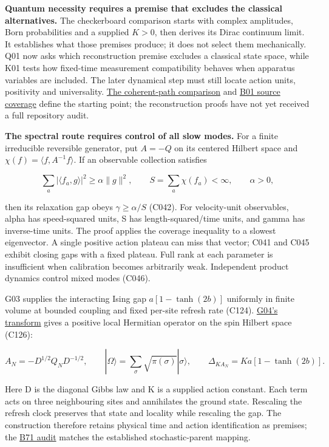 \documentclass[11pt,a4paper]{article}
\begin{document}
\textbf{Quantum necessity requires a premise that excludes the classical
alternatives.} The checkerboard comparison starts with complex
amplitudes, Born probabilities and a supplied \(K>0\), then derives its
Dirac continuum limit. It establishes what those premises produce; it
does not select them mechanically. Q01 now asks which reconstruction
premise excludes a classical state space, while K01 tests how fixed-time
measurement compatibility behaves when apparatus variables are included.
The later dynamical step must still locate action units, positivity and
universality. \href{checkerboard-dynamics.md}{The coherent-path
comparison} and \href{../references/batches/B01.md}{B01 source coverage}
define the starting point; the reconstruction proofs have not yet
received a full repository audit.

\textbf{The spectral route requires control of all slow modes.} For a
finite irreducible reversible generator, put \(A=-Q\) on its centered
Hilbert space and \(\chi(f)=\langle f,A^{-1}f\rangle\). If an observable
collection satisfies

\[\sum_a|\langle f_a,g\rangle|^2\ge\alpha\|g\|^2,\qquad
S=\sum_a\chi(f_a)<\infty,\qquad\alpha>0,\]

then its relaxation gap obeys \(\gamma\ge\alpha/S\) (C042). For
velocity-unit observables, alpha has speed-squared units, S has
length-squared/time units, and gamma has inverse-time units. The proof
applies the coverage inequality to a slowest eigenvector. A single
positive action plateau can miss that vector; C041 and C045 exhibit
closing gaps with a fixed plateau. Full rank at each parameter is
insufficient when calibration becomes arbitrarily weak. Independent
product dynamics control mixed modes (C046).

G03 supplies the interacting Ising gap \(a[1-\tanh(2b)]\) uniformly in
finite volume at bounded coupling and fixed per-site refresh rate
(C124). \href{ising-hermitian-transfer.md}{G04's transform} gives a
positive local Hermitian operator on the spin Hilbert space (C126):

\[A_N=-D^{1/2}Q_ND^{-1/2},\qquad
|\Omega\rangle=\sum_\sigma\sqrt{\pi(\sigma)}|\sigma\rangle,\qquad
\Delta_{K A_N}=Ka[1-\tanh(2b)].\]

Here D is the diagonal Gibbs law and K is a supplied action constant.
Each term acts on three neighbouring sites and annihilates the ground
state. Rescaling the refresh clock preserves that state and locality
while rescaling the gap. The construction therefore retains physical
time and action identification as premises; the
\href{../references/batches/B71.md}{B71 audit} matches the established
stochastic-parent mapping.
\end{document}
